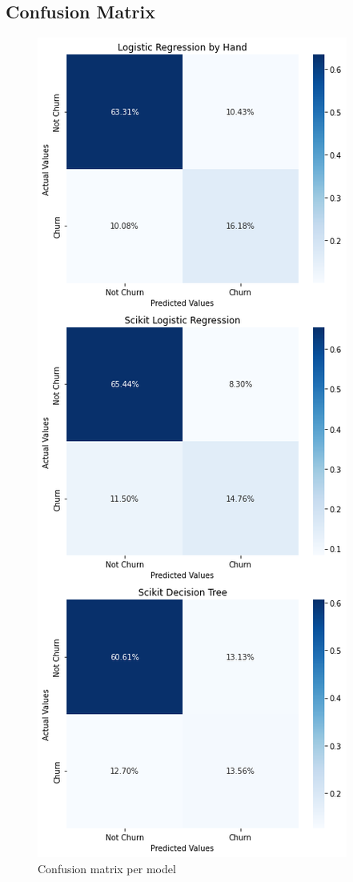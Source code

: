\documentclass[letterpaper, 10 pt, conference]{ieeeconf}
\begin{document}
\subsection{Confusion Matrix}
\begin{figure}[thpb]
    \centering
    \includegraphics[scale=0.5]{figures/confusion.png}
    \caption{Confusion matrix per model}
    \label{confusion}
 \end{figure}
\end{document}
